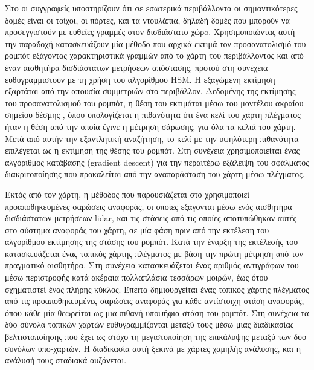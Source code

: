 Στο \cite{Zhu2011a} οι συγγραφείς υποστηρίζουν ότι σε εσωτερικά περιβάλλοντα
οι σημαντικότερες δομές είναι οι τοίχοι, οι πόρτες, και τα ντουλάπια, δηλαδή
δομές που μπορούν να προσεγγιστούν με ευθείες γραμμές στον δισδιάστατο χώρo.
Χρησιμοποιώντας αυτή την παραδοχή κατασκευάζουν μία μέθοδο που αρχικά εκτιμά τον
προσανατολισμό του ρομπότ εξάγοντας χαρακτηριστικά γραμμών από το χάρτη του
περιβάλλοντος και από έναν αισθητήρα δισδιάστατων μετρήσεων απόστασης, προτού
στη συνέχεια ευθυγραμμιστούν με τη χρήση του αλγορίθμου HSM. Η εξαγώμενη
εκτίμηση εξαρτάται από την απουσία συμμετριών στο περιβάλλον. Δεδομένης της
εκτίμησης του προσανατολισμού του ρομπότ, η θέση του εκτιμάται μέσω του
μοντέλου ακραίου σημείου δέσμης \cite{thrun2005probabilistic}, όπου
υπολογίζεται η πιθανότητα ότι ένα κελί του χάρτη πλέγματος ήταν η θέση από την
οποία έγινε η μέτρηση σάρωσης, για όλα τα κελιά του χάρτη. Μετά από αυτήν την
εξαντλητική αναζήτηση, το κελί με την υψηλότερη πιθανότητα επιλέγεται ως η
εκτίμηση της θέσης του ρομπότ. Στη συνέχεια χρησιμοποιείται ένας αλγόριθμος
κατάβασης (gradient descent) για την περαιτέρω εξάλειψη του σφάλματος
διακριτοποίησης που προκαλείται από την αναπαράσταση του χάρτη μέσω πλέγματος.

Εκτός από τον χάρτη, η μέθοδος που παρουσιάζεται στο \cite{Xie2010}
χρησιμοποιεί προαποθηκευμένες σαρώσεις αναφοράς, οι οποίες εξάγονται μέσω ενός
αισθητήρα δισδιάστατων μετρήσεων lidar, και τις στάσεις από τις οποίες
αποτυπώθηκαν αυτές στο σύστημα αναφοράς του χάρτη, σε μία φάση πριν από την
εκτέλεση του αλγορίθμου εκτίμησης της στάσης του ρομπότ. Κατά την έναρξη της
εκτέλεσής του κατασκευάζεται ένας τοπικός χάρτης πλέγματος με βάση την πρώτη
μέτρηση από τον πραγματικό αισθητήρα. Στη συνέχεια κατασκευάζεται ένας αριθμός
αντιγράφων του μέσω περιστροφής κατά ακέραια πολλαπλάσια τεσσάρων μοιρών, έως
ότου σχηματιστεί ένας πλήρης κύκλος.  Έπειτα δημιουργείται ένας τοπικός
χάρτης πλέγματος από τις προαποθηκευμένες σαρώσεις αναφοράς για κάθε αντίστοιχη
στάση αναφοράς, όπου κάθε μία θεωρείται ως μια πιθανή υποψήφια στάση του
ρομπότ. Στη συνέχεια τα δύο σύνολα τοπικών χαρτών ευθυγραμμίζονται μεταξύ τους
μέσω μιας διαδικασίας βελτιστοποίησης που έχει ως στόχο τη μεγιστοποίηση της
επικάλυψης μεταξύ των δύο συνόλων υπο-χαρτών. Η διαδικασία αυτή ξεκινά με
χάρτες χαμηλής ανάλυσης, και η ανάλυσή τους σταδιακά αυξάνεται.

